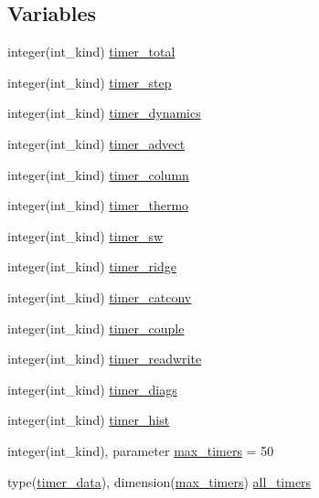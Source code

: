 \subsection*{Variables}
\begin{DoxyCompactItemize}
\item 
integer(int\_\-kind) \hyperlink{namespaceice__timers_af4544096584c21d56bb41d500d4a1e7b}{timer\_\-total}
\item 
integer(int\_\-kind) \hyperlink{namespaceice__timers_a2f62f4afeed2dc2700a9bf7c15e6d746}{timer\_\-step}
\item 
integer(int\_\-kind) \hyperlink{namespaceice__timers_ada6ea9e52bcd16e1d5ea869c9ef86e30}{timer\_\-dynamics}
\item 
integer(int\_\-kind) \hyperlink{namespaceice__timers_a661df1c3c16f3dbba252198a2de779c6}{timer\_\-advect}
\item 
integer(int\_\-kind) \hyperlink{namespaceice__timers_ab9384dde0a037de0babca404c47d3084}{timer\_\-column}
\item 
integer(int\_\-kind) \hyperlink{namespaceice__timers_af9a7c2e62659a0c8babe31eeb749aabd}{timer\_\-thermo}
\item 
integer(int\_\-kind) \hyperlink{namespaceice__timers_a6fd87221d7d148cbbd9b6c885a235034}{timer\_\-sw}
\item 
integer(int\_\-kind) \hyperlink{namespaceice__timers_a9005547a6ce9d2b619697fc3c7167df7}{timer\_\-ridge}
\item 
integer(int\_\-kind) \hyperlink{namespaceice__timers_ab82172beab2bd8755db6ebcfe7ae5f35}{timer\_\-catconv}
\item 
integer(int\_\-kind) \hyperlink{namespaceice__timers_a08bc2ebb9f8789a162d1f1ee3df678a2}{timer\_\-couple}
\item 
integer(int\_\-kind) \hyperlink{namespaceice__timers_af250a2fa78a031dcb6f923aa2afb2813}{timer\_\-readwrite}
\item 
integer(int\_\-kind) \hyperlink{namespaceice__timers_a6b3fa397674377c5596ab9a0a4e1beb2}{timer\_\-diags}
\item 
integer(int\_\-kind) \hyperlink{namespaceice__timers_a97b81f9ad9a98de0710a2f1859113352}{timer\_\-hist}
\item 
integer(int\_\-kind), parameter \hyperlink{namespaceice__timers_aa410a1135c41a4e3216716ae83adfd64}{max\_\-timers} = 50
\item 
type(\hyperlink{typeice__timers_1_1timer__data}{timer\_\-data}), dimension(\hyperlink{namespaceice__timers_aa410a1135c41a4e3216716ae83adfd64}{max\_\-timers}) \hyperlink{namespaceice__timers_a7bda531f2d88a00f031b6d6f8f104474}{all\_\-timers}

\end{DoxyCompactItemize}
